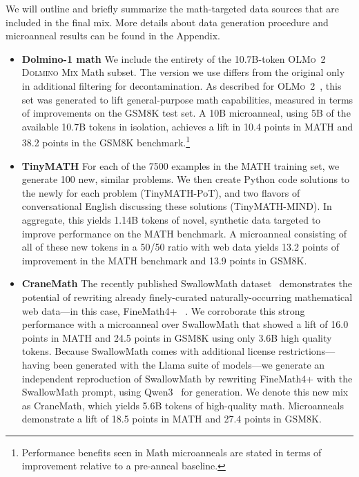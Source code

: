 \documentclass[table]{ai2style/ai2}
\newcommand{\oldOlmo}{OLMo\xspace}
\newcommand{\olmotoo}{\textsc{\oldOlmo~2}\xspace}
\newcommand{\dolminos}{\textsc{\oldOlmo~2 Dolmino Mix}\xspace}
\begin{document}
We will outline and briefly summarize the math-targeted data sources that are included in the final mix. 
More details about data generation procedure and microanneal results can be found in the Appendix.
\begin{itemize}
\item {\bf Dolmino-1 math} We include the entirety of the 10.7B-token \dolminos Math subset. The version we use differs from the original only in additional filtering for decontamination. 
As described for \olmotoo~\citet{olmo20242olmo2furious}, this set was generated to lift general-purpose math capabilities, measured in terms of improvements on the  GSM8K test set. 
A 10B microanneal, using 5B of the available 10.7B tokens in isolation, achieves a lift in 10.4 points in MATH and 38.2 points in the GSM8K benchmark.\footnote{Performance benefits seen in Math microanneals are stated in terms of improvement relative to a pre-anneal baseline.}

\item {\bf TinyMATH} For each of the 7500 examples in the MATH training set, we generate 100 new, similar problems. We then create Python code solutions to the newly for each problem (TinyMATH-PoT), and two flavors of conversational English discussing these solutions (TinyMATH-MIND). In aggregate, this yields 1.14B tokens of novel, synthetic data targeted to improve performance on the MATH benchmark. 
A microanneal consisting of all of these new tokens in a 50/50 ratio with web data yields 13.2 points of improvement in the MATH benchmark and 13.9 points in GSM8K.

\item {\bf CraneMath} The recently published SwallowMath dataset~\citep{fujii2025rewriting} demonstrates the potential of rewriting already finely-curated naturally-occurring mathematical web data---in this case, FineMath4+ ~\citep{allal2025smollm2smolgoesbig}. We corroborate this strong performance with a microanneal over SwallowMath that showed a lift of 16.0 points in MATH and 24.5 points in GSM8K using only 3.6B high quality tokens. 
Because SwallowMath comes with additional license restrictions---having been generated with the Llama suite of models---we generate an independent reproduction of SwallowMath by rewriting FineMath4+ with the SwallowMath prompt, using Qwen3~\citep{qwen3} for generation. We denote this new mix as CraneMath, which yields 5.6B tokens of high-quality math. 
Microanneals demonstrate a lift of 18.5 points in MATH and 27.4 points in GSM8K.


\end{itemize}
\end{document}
